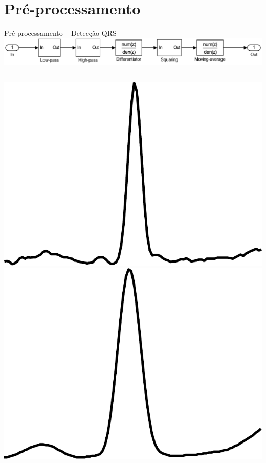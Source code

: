 
\section{Pré-processamento}

\begin{frame}{Pré-processamento -- Detecção QRS}
    \center
    \includegraphics[scale=0.55]{figures/qrs-filter.pdf}
    \vskip10pt
    \begin{columns}[b]
        \hskip-15pt
        \includegraphics[scale=0.15]{figures/original.pdf}
        \includegraphics[scale=0.15]{figures/lowpass.pdf}

\end{columns}
\end{frame}
